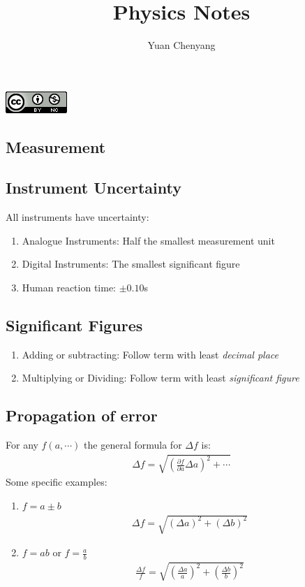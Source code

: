 \documentclass[11pt]{article}
\title{Physics Notes}
\author{Yuan Chenyang}
\makeatletter
\renewcommand\tableofcontents{%
    \@starttoc{toc}%
}
\newcommand{\pd}[2]{
\ensuremath{ \frac{\partial #1}{\partial #2} }}			%
\makeatother
\begin{document}
\maketitle
\begin{center}
\includegraphics[scale=0.7]{deed.png} 
\end{center}

\begin{multicols}{2}
\tableofcontents
\end{multicols}
\newpage

\begin{multicols*}{3}
\section{Measurement}
\subsection{Instrument Uncertainty}
All instruments have uncertainty:
\begin{enumerate}
\item Analogue Instruments: Half the smallest measurement unit
\item Digital Instruments: The smallest significant figure
\item Human reaction time: $\pm 0.10$s
\end{enumerate}
\subsection{Significant Figures}
\begin{enumerate}
\item Adding or subtracting: Follow term with least {\em decimal place}
\item Multiplying or Dividing: Follow term with least {\em significant figure}
\end{enumerate}
\subsection{Propagation of error}
For any $f(a, \cdots)$ the general formula for $\Delta f$ is:
	\begin{align*}
	\Delta f = \sqrt{\left( \pd{f}{a} \Delta a \right)^2 + \cdots}
	\end{align*}
Some specific examples:
\begin{enumerate}
\item $f=a\pm b$
	\begin{align*}
	\Delta f = \sqrt{(\Delta a)^2+(\Delta b)^2}
	\end{align*}
\item $f=ab$ or $f=\frac{a}{b}$
	\begin{align*}
	\frac{\Delta f}{f} = \sqrt{\left(\frac{\Delta a}{a} \right)^2+\left(\frac{\Delta b}{b} \right)^2}
	\end{align*}
\end{enumerate}

\end{multicols*}
\end{document}
